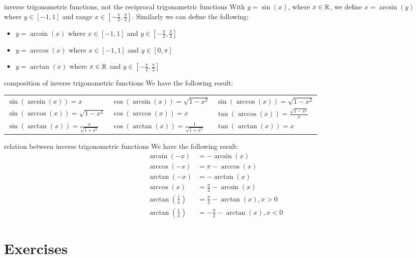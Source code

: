 \documentclass{article}
\begin{document}
\begin{myleftlinebox}
	inverse trigonometric functions, not the reciprocal trigonometric functions
	\tcblower
	With $y=\sin(x)$, where $x\in \mathbb{R}$, we define $x=\arcsin(y)$ where $y\in[-1,1]$ and range $x\in [-\frac{\pi}{2},\frac{\pi}{2}]$. Similarly we can define the following:
	\begin{itemize}
		\item $y=\arcsin(x)$ where $x\in[-1,1]$ and $y\in [-\frac{\pi}{2},\frac{\pi}{2}]$
		\item $y=\arccos(x)$ where $x\in[-1,1]$ and $y\in [0,\pi]$
		\item $y=\arctan(x)$ where $x\in\mathbb{R}$ and $y\in [-\frac{\pi}{2},\frac{\pi}{2}]$
	\end{itemize}
\end{myleftlinebox}

\begin{myleftlinebox}
	composition of inverse trigonometric functions
	\tcblower
	We have the following result:
	\begin{center}
		\begin{tabular}{lll}
			$\sin(\arcsin(x))=x$ & $\cos(\arcsin(x))=\sqrt{1-x^2}$ & $\sin(\arccos(x))=\sqrt{1-x^2}$\\
			$\sin(\arccos(x))=\sqrt{1-x^2}$ & $\cos(\arccos(x))=x$ & $\tan(\arccos(x))=\frac{\sqrt{1-x^2}}{x}$\\
			$\sin(\arctan(x))=\frac{x}{\sqrt{1+x^2}}$ & $\cos(\arctan(x))=\frac{1}{\sqrt{1+x^2}}$ & $\tan(\arctan(x))=x$
		\end{tabular}
	\end{center}
\end{myleftlinebox}

\begin{myleftlinebox}
	relation between inverse trigonometric functions
	\tcblower
	We have the following result:
	\begin{align*}
		\arcsin(-x) &= -\arcsin(x)\\
		\arccos(-x) &= \pi-\arccos(x)\\
		\arctan(-x) &= -\arctan(x)\\
		\arccos(x) &= \frac{\pi}{2}-\arcsin(x)\\
		\arctan(\frac{1}{x}) &= \frac{\pi}{2}- \arctan(x), x>0\\
		\arctan(\frac{1}{x}) &= -\frac{\pi}{2}- \arctan(x), x<0
	\end{align*}
\end{myleftlinebox}

\section{Exercises}
\end{document}
